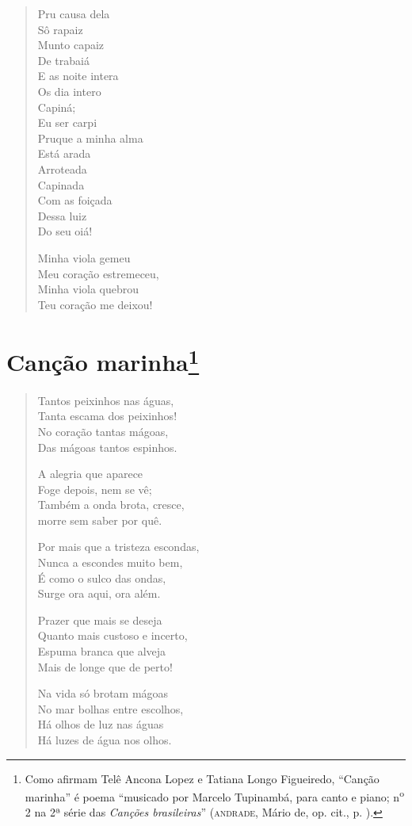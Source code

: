 \begin{verse}
Pru causa dela\\
Sô rapaiz\\
Munto capaiz\\
De trabaiá\\
E as noite intera\\
Os dia intero\\
Capiná;\\
Eu ser carpi\\
Pruque a minha alma\\
Está arada\\
Arroteada\\
Capinada\\
Com as foiçada\\
Dessa luiz\\
Do seu oiá!

Minha viola gemeu\\
Meu coração estremeceu,\\
Minha viola quebrou\\
Teu coração me deixou!
\end{verse}

\chapter{Canção marinha\footnote[*]{Como afirmam Telê Ancona Lopez e
  Tatiana Longo Figueiredo, ``Canção marinha'' é poema ``musicado por
  Marcelo Tupinambá, para canto e piano; n\textsuperscript{o} 2 na 2ª
  série das \emph{Canções brasileiras}'' (\textsc{andrade}, Mário de, op. cit.,
  p. ).}}

\begin{verse}
Tantos peixinhos nas águas,\\
Tanta escama dos peixinhos!\\
No coração tantas mágoas,\\
Das mágoas tantos espinhos.

A alegria que aparece\\
Foge depois, nem se vê;\\
Também a onda brota, cresce,\\
morre sem saber por quê.

Por mais que a tristeza escondas,\\
Nunca a escondes muito bem,\\
É como o sulco das ondas,\\
Surge ora aqui, ora além.

Prazer que mais se deseja\\
Quanto mais custoso e incerto,\\
Espuma branca que alveja\\
Mais de longe que de perto!

Na vida só brotam mágoas\\
No mar bolhas entre escolhos,\\
Há olhos de luz nas águas\\
Há luzes de água nos olhos.
\end{verse}


